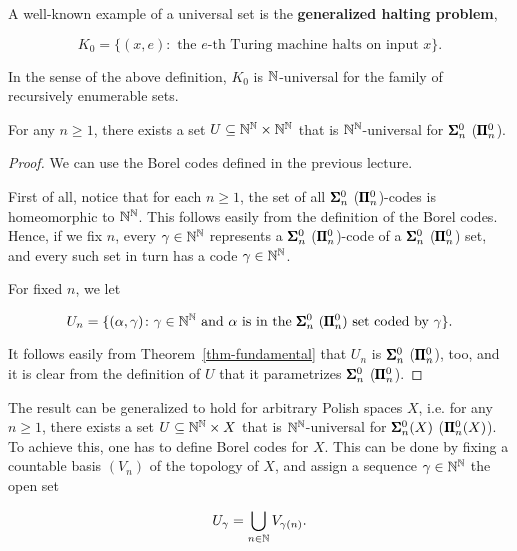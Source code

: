 A well-known example of a universal set is the \textbf{generalized halting problem},

\begin{equation}
K_0 = \{ (x,e) \colon \text{ the $e$-th Turing machine halts on input $x$} \}.
\end{equation}

In the sense of the above definition, $K_0$ is $\mathbb{N}$-universal for the family of recursively enumerable sets.

\begin{proposition}\label{prop-borel-universal}For any $n \geq 1$, there exists a set $U \subseteq \mathbb{N}^{\mathbb{N}} \times \mathbb{N}^{\mathbb{N}}$ that is $\mathbb{N}^{\mathbb{N}}$-universal for $\pmb{\Sigma}^0_n$ ($\pmb{\Pi}^0_n$).

\end{proposition}\begin{proof}We can use the Borel codes defined in the previous lecture.

First of all, notice that for each $n \geq 1$, the set of all $\pmb{\Sigma}^0_n$ ($\pmb{\Pi}^0_{n}$)-codes is homeomorphic to $\mathbb{N}^{\mathbb{N}}$. This follows easily from the definition of the Borel codes. Hence, if we fix $n$, every $\gamma\in \mathbb{N}^{\mathbb{N}}$ represents a $\pmb{\Sigma}^0_n$ ($\pmb{\Pi}^0_n$)-code of a $\pmb{\Sigma}^0_n$ ($\pmb{\Pi}^0_n$) set, and every such set in turn has a code $\gamma \in \mathbb{N}^{\mathbb{N}}$.

For fixed $n$, we let

\begin{equation}
U_n = \{ (\alpha,\gamma) \colon \gamma \in \mathbb{N}^{\mathbb{N}} \text{ and $\alpha$ is in the $\pmb{\Sigma}^0_n$ $(\pmb{\Pi}^0_n)$ set coded by $\gamma$}\}.
\end{equation}

It follows easily from Theorem~\ref{thm-fundamental} that $U_n$ is $\pmb{\Sigma}^0_n$ ($\pmb{\Pi}^0_n$), too, and it is clear from the definition of $U$ that it parametrizes $\pmb{\Sigma}^0_n$ ($\pmb{\Pi}^0_n$).

\end{proof}The result can be generalized to hold for arbitrary Polish spaces $X$, i.e. for any $n \geq 1$, there exists a set $U \subseteq \mathbb{N}^{\mathbb{N}} \times X$ that is $\mathbb{N}^{\mathbb{N}}$-universal for $\pmb{\Sigma}^0_n(X)$ ($\pmb{\Pi}^0_n(X)$). To achieve this, one has to define Borel codes for $X$. This can be done by fixing a countable basis $(V_n)$ of the topology of $X$, and assign a sequence $\gamma \in \mathbb{N}^{\mathbb{N}}$ the open set

\begin{equation}
U_\gamma = \bigcup_{n \in \mathbb{N}} V_{\gamma(n)}.
\end{equation}


